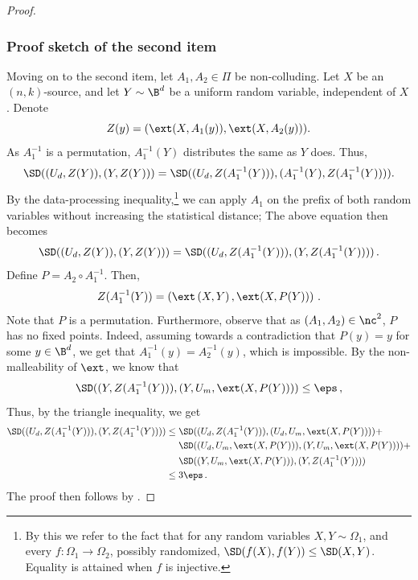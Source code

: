 \documentclass{toc}
\begin{document}
\begin{proof}
%
\subsubsection*{Proof sketch of the second item}
	
Moving on to the second item, let $A_1,A_2 \in \Pi$ be %
non-colluding.
Let $X$ be an $(n,k)$-source, and let $Y \sim \B^{d}$ be 
	a uniform random variable, independent of $X$. Denote	
	\[
	Z(y) = ( \ext(X,A_{1}(y)),\ext(X,A_{2}(y)) ).
	\]
	As $A_{1}^{-1}$ is a permutation, $A_1^{-1}(Y)$ distributes the same as $Y$ does. Thus,
	\[
	\SD((U_d,Z(Y)),(Y,Z(Y))) = 
	\SD((U_d,Z(A_{1}^{-1}(Y))),({A}_{1}^{-1}(Y),{Z}({A}_{1}^{-1}(Y)))).
	\]
	By the data-processing inequality,\footnote{By this we refer to the fact that for any random variables
	$X,Y \sim \Omega_1$, and every $f \colon \Omega_1 \rightarrow \Omega_2$, possibly randomized, $\SD(f(X),f(Y)) \le \SD(X,Y)$. Equality is attained when $f$ is injective.}
	we can apply ${A}_1$ on the prefix of both random variables without increasing
	the statistical distance; The above equation then becomes
	\begin{equation}\label{eq:sec423 i}
	\SD((U_d,{Z}(Y)),(Y,{Z}(Y))) = 
	\SD((U_d,{Z}({A}_{1}^{-1}(Y))),(Y,{Z}({A}_{1}^{-1}(Y))))\,.
	\end{equation}
	Define $P = {A}_{2} \circ {A}_{1}^{-1}$. Then,
	\begin{align*}
	{Z}({A}_{1}^{-1}(Y)) = 
	\left( \ext\left( X,Y \right),\ext( X,P(Y)) \right)\,.
	\end{align*}
	Note that $P$ is a permutation. Furthermore, observe that as $({A}_1,{A}_{2}) \in \nc^{2}$,  $P$ has no fixed points. Indeed, assuming
	towards a contradiction that $P(y)=y$ for some $y \in \B^{d}$, we get
	that ${A}_{1}^{-1}(y) = {A}^{-1}_{2}(y)$, which is impossible.
	By the non-malleability of $\ext$, we know that
	\[
	\SD((Y,{Z}({A}_1^{-1}(Y))),(Y,U_m,\ext(X,P(Y)))) \le \eps\,,
	\]
    Thus, by the triangle inequality, we get
	\begin{align}
	\SD((U_d,{Z}({A}_{1}^{-1}(Y))),(Y,{Z}({A}_{1}^{-1}(Y)))) &\le 
	\SD((U_d,{Z}({A}_{1}^{-1}(Y))),(U_d,U_m,\ext(X,P(Y)))) + \nonumber \\
	& ~~~~\SD((U_d,U_m,\ext(X,P(Y))),(Y,U_m,\ext(X,P(Y)))) + \nonumber \\
	& ~~~~\SD((Y,U_m,\ext(X,P(Y))),(Y,{Z}({A}_{1}^{-1}(Y)))) \nonumber \\
	&\le 3\eps\,.
	\end{align}
	The proof then follows by .
\end{proof}
\end{document}
